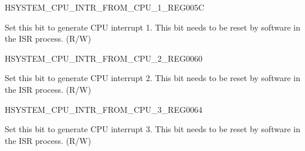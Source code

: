 \begin{register}{H}{SYSTEM\_CPU\_INTR\_FROM\_CPU\_1\_REG}{\hexprefix{}005C}\label{regdesc:SYSTEMCPUINTRFROMCPU1REG}
%
%
\regnewline%
\begin{regdesc}\begin{reglist}
\label{fielddesc:SYSTEMCPUINTRFROMCPU1}\item [SYSTEM\_CPU\_INTR\_FROM\_CPU\_1] Set this bit to generate CPU interrupt 1. This bit needs to be reset by software in the ISR process. (R/W)
\end{reglist}\end{regdesc}
\end{register}

\begin{register}{H}{SYSTEM\_CPU\_INTR\_FROM\_CPU\_2\_REG}{\hexprefix{}0060}\label{regdesc:SYSTEMCPUINTRFROMCPU2REG}
%
%
\regnewline%
\begin{regdesc}\begin{reglist}
\label{fielddesc:SYSTEMCPUINTRFROMCPU2}\item [SYSTEM\_CPU\_INTR\_FROM\_CPU\_2] Set this bit to generate CPU interrupt 2. This bit needs to be reset by software in the ISR process. (R/W)
\end{reglist}\end{regdesc}
\end{register}

\begin{register}{H}{SYSTEM\_CPU\_INTR\_FROM\_CPU\_3\_REG}{\hexprefix{}0064}\label{regdesc:SYSTEMCPUINTRFROMCPU3REG}
%
%
\regnewline%
\begin{regdesc}\begin{reglist}
\label{fielddesc:SYSTEMCPUINTRFROMCPU3}\item [SYSTEM\_CPU\_INTR\_FROM\_CPU\_3] Set this bit to generate CPU interrupt 3. This bit needs to be reset by software in the ISR process. (R/W)
\end{reglist}\end{regdesc}
\end{register}

